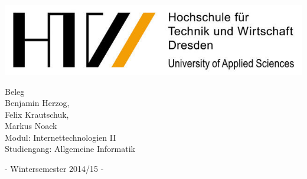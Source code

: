 \documentclass[a4paper,oneside,titlepage,12pt]{article}
\begin{document}
\begin{titlepage}
\begin{center}
	\includegraphics[width=.5\textwidth]{Bilder/HTW-Logo.png}
\end{center}
	\begin{center}
        	
        	\vspace*{2cm}
		\Huge{Beleg\\} \vspace*{1cm}
		\huge{Benjamin Herzog,\\ Felix Krautschuk,\\ Markus Noack\\}
		\vspace*{1cm}
		\Large{
			Modul: Internettechnologien II\\}
		\vspace*{2cm}
		\normalsize{
			Studiengang: Allgemeine Informatik\\
		}
	\end{center}
	\vspace{4cm}
\begin{center}
    \large{ - Wintersemester 2014/15 -  \\}
    \vspace*{2cm}
\end{center}
\end{titlepage}




\setcounter{page}{2} 
\tableofcontents
{} \setcounter{roemisch}{\value{page}}

\setcounter{page}{2}
\end{document}
